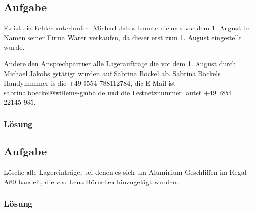 \subsection{Aufgabe}
\label{sec:uebung_02.aufgabe_07}
Es ist ein Fehler unterlaufen. Michael Jakos konnte niemals vor dem 1. August im Namen seiner Firma Waren verkaufen, da dieser erst zum 1. August eingestellt wurde.

Ändere den Ansprechpartner alle Lageraufträge die vor dem 1. August durch Michael Jakobs getätigt wurden auf Sabrina Böckel ab. Sabrina Böckels Handynummer is die +49 0554 788112784, die E-Mail ist sabrina.boeckel@willems-gmbh.de und die Festnetznummer lautet +49 7854 22145 985.

\subsubsection*{Lösung}
\label{sec:uebung_02.aufgabe_07.loesung}

\subsection{Aufgabe}
\label{sec:uebung_02.aufgabe_08}
Lösche alle Lagereinträge, bei denen es sich um Aluminium Geschliffen im Regal A80 handelt, die von Lena Hörnchen hinzugefügt wurden.

\subsubsection*{Lösung}
\label{sec:uebung_02.aufgabe_08.loesung}
